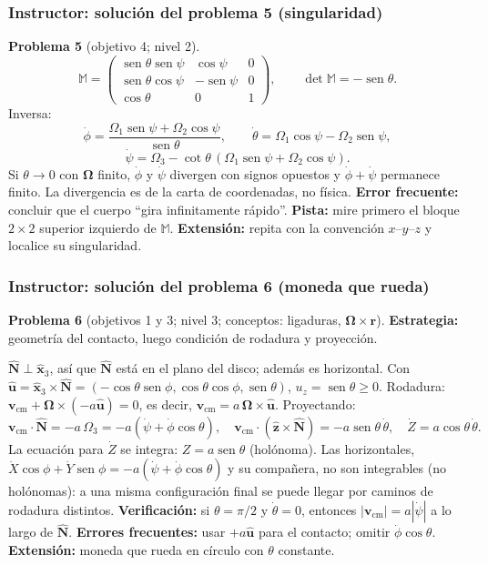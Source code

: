 \documentclass[spanish]{beamer}
\providecommand{\sen}{\operatorname{sen}}       %
\newcommand{\vect}[1]{\mathbf{#1}}              %
\newcommand{\uv}[1]{\hat{\mathbf{#1}}}          %
\newcommand{\bOmega}{\bm{\Omega}}               %
\begin{document}
\begin{frame}
  \frametitle{Instructor: solución del problema 5 (singularidad)}
  \footnotesize
  \textbf{Problema 5} (objetivo 4; nivel 2).
  \[
    \mathbb{M}=\begin{pmatrix}\sen\theta\sen\psi&\cos\psi&0\\ \sen\theta\cos\psi&-\sen\psi&0\\ \cos\theta&0&1\end{pmatrix},
    \qquad \det\mathbb{M}=-\sen\theta .
  \]
  Inversa:
  \[
    \dot\phi=\frac{\Omega_1\sen\psi+\Omega_2\cos\psi}{\sen\theta},\qquad
    \dot\theta=\Omega_1\cos\psi-\Omega_2\sen\psi,
  \]
  \[
    \dot\psi=\Omega_3-\cot\theta\,(\Omega_1\sen\psi+\Omega_2\cos\psi).
  \]
  Si $\theta\to0$ con $\bOmega$ finito, $\dot\phi$ y $\dot\psi$ divergen con signos
  opuestos y $\dot\phi+\dot\psi$ permanece finito. La divergencia es de la carta de
  coordenadas, no física.
  \textbf{Error frecuente:} concluir que el cuerpo ``gira infinitamente rápido''.
  \textbf{Pista:} mire primero el bloque $2\times2$ superior izquierdo de $\mathbb{M}$.
  \textbf{Extensión:} repita con la convención $x$–$y$–$z$ y localice su singularidad.
\end{frame}

\begin{frame}
  \frametitle{Instructor: solución del problema 6 (moneda que rueda)}
  \footnotesize
  \textbf{Problema 6} (objetivos 1 y 3; nivel 3; conceptos: ligaduras, $\bOmega\times\vect{r}$).
  \textbf{Estrategia:} geometría del contacto, luego condición de rodadura y proyección.

  \medskip $\uv{N}\perp\uv{x}_3$, así que
  $\uv{N}$ está en el plano del disco; además es horizontal. Con
  $\uv{u}=\uv{x}_3\times\uv{N}=(-\cos\theta\sen\phi,\cos\theta\cos\phi,\sen\theta)$,
  $u_z=\sen\theta\ge0$. Rodadura: $\vect{v}_{\mathrm{cm}}+\bOmega\times(-a\uv{u})=0$,
  es decir, $\vect{v}_{\mathrm{cm}}=a\,\bOmega\times\uv{u}$. Proyectando:
  \[
    \vect{v}_{\mathrm{cm}}\cdot\uv{N}=-a\,\Omega_3=-a(\dot\psi+\dot\phi\cos\theta),\quad
    \vect{v}_{\mathrm{cm}}\cdot(\uv{z}\times\uv{N})=-a\sen\theta\,\dot\theta,\quad
    \dot Z=a\cos\theta\,\dot\theta .
  \]
  La ecuación para $\dot Z$ se integra: $Z=a\sen\theta$ (holónoma). Las horizontales,
  $\dot X\cos\phi+\dot Y\sen\phi=-a(\dot\psi+\dot\phi\cos\theta)$ y su compañera, no
  son integrables (no holónomas): a una misma configuración final se puede llegar
  por caminos de rodadura distintos. \textbf{Verificación:} si $\theta=\pi/2$ y $\dot\theta=0$, entonces
  $|\vect{v}_{\mathrm{cm}}|=a|\dot\psi|$ a lo largo de $\uv{N}$.
  \textbf{Errores frecuentes:} usar $+a\uv{u}$ para el contacto; omitir $\dot\phi\cos\theta$.
  \textbf{Extensión:} moneda que rueda en círculo con $\theta$ constante.
\end{frame}
\end{document}
